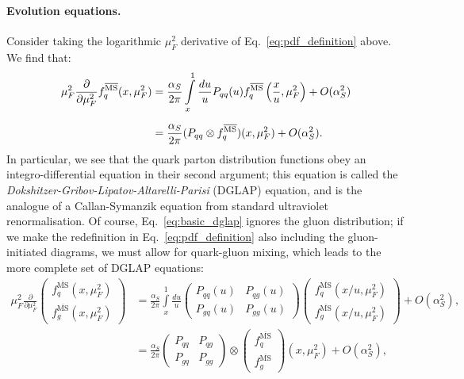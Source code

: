 \documentclass[withindex,glossary]{cam-thesis}
\begin{document}
\paragraph{Evolution equations.} Consider taking the logarithmic $\mu_F^2$ derivative of Eq.~\eqref{eq:pdf_definition} above. We find that:
\begin{align}
\mu_F^2 \frac{\partial}{\partial \mu_F^2} f_q^{\overline{\text{MS}}}(x,\mu_F^2)& = \frac{\alpha_S}{2\pi} \int\limits_{x}^{1} \frac{du}{u} P_{qq}(u) f_q^{\overline{\text{MS}}}\left( \frac{x}{u}, \mu_F^2\right) + O(\alpha_S^2) \notag \\[1.5ex]
\label{eq:basic_dglap}
&= \frac{\alpha_S}{2\pi} (P_{qq} \otimes f_q^{\overline{\text{MS}}})(x, \mu_F^2) + O(\alpha_S^2).
\end{align}
In particular, we see that the quark parton distribution functions obey an integro-differential equation in their second argument; this equation is called the \textit{Dokshitzer-Gribov-Lipatov-Altarelli-Parisi} (DGLAP) equation, and is the analogue of a Callan-Symanzik equation from standard ultraviolet renormalisation. Of course, Eq.~\eqref{eq:basic_dglap} ignores the gluon distribution; if we make the redefinition in Eq.~\eqref{eq:pdf_definition} also including the gluon-initiated diagrams, we must allow for quark-gluon mixing, which leads to the more complete set of DGLAP equations:
\begin{align}
\mu_F^2 \frac{\partial}{\partial \mu_F^2} \begin{pmatrix} f_q^{\overline{\text{MS}}}(x,\mu_F^2) \\ f_g^{\overline{\text{MS}}}(x,\mu_F^2) \end{pmatrix} &= \frac{\alpha_S}{2\pi} \int\limits_{x}^{1} \frac{du}{u} \begin{pmatrix} P_{qq}(u) & P_{qg}(u) \\ P_{gq}(u) & P_{gg}(u) \end{pmatrix}  \begin{pmatrix} f_q^{\overline{\text{MS}}}\left( x/u, \mu_F^2\right) \\ f_g^{\overline{\text{MS}}}\left(x/u, \mu_F^2\right) \end{pmatrix} + O(\alpha_S^2),\\[1.5ex]
&= \frac{\alpha_S}{2\pi} \begin{pmatrix} P_{qq} & P_{qg} \\ P_{gq} & P_{gg} \end{pmatrix}  \otimes \begin{pmatrix} f_q^{\overline{\text{MS}}} \\ f_g^{\overline{\text{MS}}} \end{pmatrix} \left(x , \mu_F^2\right) + O(\alpha_S^2),
\end{align}
\end{document}
